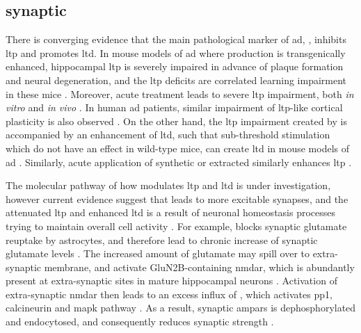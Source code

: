 \subsection{synaptic \label{ad.synaptic}}

There is converging evidence that the main pathological marker of \gls{ad}, \abeta, inhibits \gls{ltp} and promotes \gls{ltd}. In mouse models of \gls{ad} where \abeta production is transgenically enhanced, hippocampal \gls{ltp} is severely impaired in advance of plaque formation and neural degeneration, and the \gls{ltp} deficits are correlated learning impairment in these mice \citep{hsia99, chapman99, roberson11}. Moreover, acute \abeta treatment leads to severe \gls{ltp} impairment, both \textit{in vitro} \citep{lambert98, shankar08} and \textit{in vivo} \citep{walsh02, hu08}. In human \gls{ad} patients, similar impairment of \gls{ltp}-like cortical plasticity is also observed \citep{inghilleri06, koch12}. On the other hand, the \gls{ltp} impairment created by \abeta is accompanied by an enhancement of \gls{ltd}, such that sub-threshold stimulation which do not have an effect in wild-type mice, can create \gls{ltd} in mouse models of \gls{ad} \citep{hsia99, fitzjohn01, jacobsen06}. 
Similarly, acute application of synthetic or extracted \abeta similarly enhances \gls{ltp} \citep{hsieh06, li09}. 

The molecular pathway of how \abeta modulates \gls{ltp} and \gls{ltd} is under investigation, however current evidence suggest that \abeta leads to more excitable synapses, and the attenuated \gls{ltp} and enhanced \gls{ltd} is a result of neuronal homeostasis processes trying to maintain overall cell activity \citep{guntupalli16, jang16}. For example, \abeta blocks synaptic glutamate reuptake by astrocytes, and therefore lead to chronic increase of synaptic glutamate levels \citep{matos08, li09}. The increased amount of glutamate may spill over to extra-synaptic membrane, and activate GluN2B-containing \gls{nmdar}, which is abundantly present at extra-synaptic sites in mature hippocampal neurons \citep{citri08, li11, shipton14}. Activation of extra-synaptic \gls{nmdar} then leads to an excess influx of , which activates \gls{pp1}, calcineurin and \gls{mapk} pathway \citep{hsieh06, shankar07, zhao10}. As a result, synaptic \glspl{ampar} is dephosphorylated and endocytosed, and consequently reduces synaptic strength \citep{hsieh06, liu10, minanomolina11}. 

